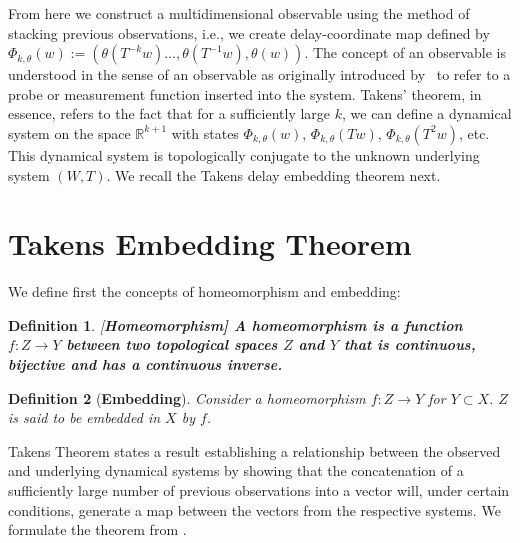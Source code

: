 \documentclass[a4paper,12pt,twoside]{report}
\newtheorem{Definition}{Definition}[]
\begin{document}
From here we construct a multidimensional observable using the method of stacking previous observations, i.e., we create delay-coordinate map defined by
$\Phi_{k,\theta}(w) := (\theta(T^{-k}w)\ldots,\theta(T^{-1}w),\theta(w))$.  
The concept of an observable is understood in the sense of an observable as originally introduced by~\cite{takens1981detecting, genericObservableAeyels} to refer to a probe or measurement function inserted into the system.
Takens' theorem, in essence,  refers to the fact that for a sufficiently large $k$, we can define a dynamical system on the space $\mathbb{R}^{k+1}$ with states $\Phi_{k,\theta}(w)$, $\Phi_{k,\theta}(Tw)$, $\Phi_{k,\theta}(T^2w)$, etc. This dynamical system is topologically conjugate to the unknown underlying system $(W,T)$. We recall the Takens delay embedding theorem next.



\section{Takens Embedding Theorem}\label{sect_Takens}

We define first the concepts of homeomorphism and embedding:
\begin{Definition}\rm
  [\bf {Homeomorphism}]\label{Dfn_homeo}\rm
  A homeomorphism is a function $f:Z\rightarrow Y$ between two topological spaces $Z$ and $Y$ that is continuous, bijective and has a continuous inverse. 
\end{Definition}

\begin{Definition}
  [\bf {Embedding}]\label{Dfn_embed}\rm
  Consider a homeomorphism $f:Z\rightarrow Y$ for $Y\subset X$. $Z$ is said to be embedded in $X$ by $f$.
\end{Definition}

Takens Theorem states a result establishing a relationship between the observed and underlying dynamical systems by showing that the concatenation of a sufficiently large number of previous observations into a vector will, under certain conditions, generate a map between the vectors from the respective systems.  We formulate the theorem from \cite{takens1981detecting}.  
\end{document}
